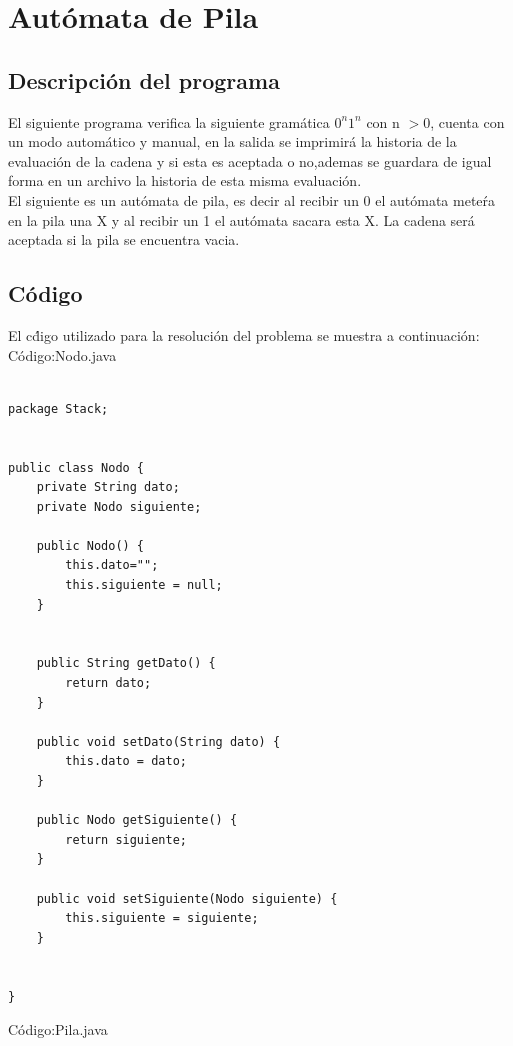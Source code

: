 \section{Aut\'omata de Pila}
\subsection{ Descripci\'on del programa}
\justify
El siguiente programa verifica la siguiente gram\'atica $0^n 1^n$ con n $>$0, cuenta con un modo autom\'atico y manual, en la salida se imprimir\'a la historia de la evaluaci\'on de la cadena y si esta es aceptada o no,ademas se guardara de igual forma en un archivo la historia de esta misma evaluaci\'on.\\
El siguiente es un aut\'omata de pila, es decir al recibir un 0 el aut\'omata mete\'ra en la pila una X y al recibir un 1 el aut\'omata sacara esta X. La cadena ser\'a aceptada si la pila se encuentra vacia.\\
\subsection{C\'odigo}
El c\'digo utilizado para la resoluci\'on del problema se muestra a continuaci\'on:\\

C\'odigo:Nodo.java

\lstset{language=Java, breaklines=true, basicstyle=\footnotesize}
\begin{lstlisting}[frame=single]
	
package Stack;


public class Nodo {
    private String dato;
    private Nodo siguiente;

    public Nodo() {
        this.dato="";
        this.siguiente = null;
    }

  
    public String getDato() {
        return dato;
    }

    public void setDato(String dato) {
        this.dato = dato;
    }

    public Nodo getSiguiente() {
        return siguiente;
    }

    public void setSiguiente(Nodo siguiente) {
        this.siguiente = siguiente;
    }
    
    
}

\end{lstlisting}
\vspace{1.5cm}
C\'odigo:Pila.java

